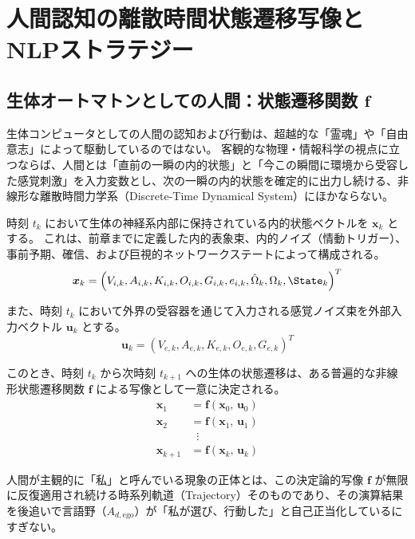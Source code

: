 \chapter{人間認知の離散時間状態遷移写像とNLPストラテジー}

\section{生体オートマトンとしての人間：状態遷移関数 $\boldsymbol{f}$}

生体コンピュータとしての人間の認知および行動は、超越的な「霊魂」や「自由意志」によって駆動しているのではない。
客観的な物理・情報科学の視点に立つならば、人間とは「直前の一瞬の内的状態」と「今この瞬間に環境から受容した感覚刺激」を入力変数とし、次の一瞬の内的状態を確定的に出力し続ける、非線形な離散時間力学系（Discrete-Time Dynamical System）にほかならない。

時刻 $t_k$ において生体の神経系内部に保持されている内的状態ベクトルを $\boldsymbol{x}_k$ とする。
これは、前章までに定義した内的表象束、内的ノイズ（情動トリガー）、事前予期、確信、および巨視的ネットワークステートによって構成される。
\begin{equation}
    \boldsymbol{x}_k = \left( V_{i,k}, A_{i,k}, K_{i,k}, O_{i,k}, G_{i,k}, e_{i,k}, \hat{\Omega}_k, \Omega_k, \State_k \right)^T
\end{equation}

また、時刻 $t_k$ において外界の受容器を通じて入力される感覚ノイズ束を外部入力ベクトル $\boldsymbol{u}_k$ とする。
\begin{equation}
    \boldsymbol{u}_k = \left( V_{e,k}, A_{e,k}, K_{e,k}, O_{e,k}, G_{e,k} \right)^T
\end{equation}

このとき、時刻 $t_k$ から次時刻 $t_{k+1}$ への生体の状態遷移は、ある普遍的な非線形状態遷移関数 $\boldsymbol{f}$ による写像として一意に決定される。
\begin{align}
    \boldsymbol{x}_1 &= \boldsymbol{f}\left( \boldsymbol{x}_0, \, \boldsymbol{u}_0 \right) \\
    \boldsymbol{x}_2 &= \boldsymbol{f}\left( \boldsymbol{x}_1, \, \boldsymbol{u}_1 \right) \\
    &\;\;\vdots \nonumber \\
    \boldsymbol{x}_{k+1} &= \boldsymbol{f}\left( \boldsymbol{x}_k, \, \boldsymbol{u}_k \right)
\end{align}

人間が主観的に「私」と呼んでいる現象の正体とは、この決定論的写像 $\boldsymbol{f}$ が無限に反復適用され続ける時系列軌道（Trajectory）そのものであり、その演算結果を後追いで言語野（$A_{d,\mathrm{ego}}$）が「私が選び、行動した」と自己正当化しているにすぎない。

